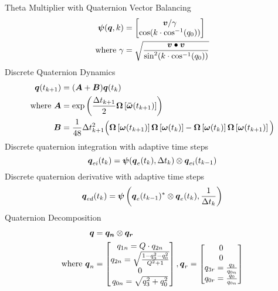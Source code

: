 \begin{nomenclature}
Theta Multiplier with Quaternion Vector Balancing\\
\begin{equation}
  \begin{aligned}
    \boldsymbol{\psi}(\boldsymbol{q}, k) &= \begin{bmatrix} \boldsymbol{v} / \gamma \\ \cos ( k \cdot \cos^{-1} (q_0))  \end{bmatrix} \\
    \text{where } \gamma &= \sqrt{\frac{\boldsymbol{v} \bullet \boldsymbol{v}}{\sin^2 ( k \cdot \cos^{-1} (q_0))}}
   \end{aligned}
\end{equation}
Discrete Quaternion Dynamics
\begin{equation}
  \begin{aligned}
    \boldsymbol{q}(t_{k+1}) &= ( \boldsymbol{A} + \boldsymbol{B} ) \boldsymbol{q}(t_{k}) \\
    \text{where } \boldsymbol{A} &= \exp \left( \frac{\Delta t_{k+1}}{2} \boldsymbol{\Omega} \left[ \boldsymbol{\bar{\omega}}(t_{k+1}) \right] \right)\\
    \boldsymbol{B} &= \frac{1}{48} \Delta t_{k+1}^2 \Big(
    \boldsymbol{\Omega} \left[\boldsymbol{\omega}(t_{k+1}) \right]
    \boldsymbol{\Omega} \left[\boldsymbol{\omega}(t_{k})   \right] -
    \boldsymbol{\Omega} \left[\boldsymbol{\omega}(t_{k})   \right]
    \boldsymbol{\Omega} \left[\boldsymbol{\omega}(t_{k+1}) \right]
      \Big)
  \end{aligned}
\end{equation}
Discrete quaternion integration with adaptive time steps\\
\begin{equation} \boldsymbol{q}_{ei}(t_k) = \boldsymbol{\psi}(\boldsymbol{q}_e(t_{k}), \Delta t_{k}) \otimes \boldsymbol{q}_{ei}(t_{k-1}) \end{equation}
Discrete quaternion derivative with adaptive time steps\\
\begin{equation} \boldsymbol{q}_{ed}(t_k) = \boldsymbol{\psi}\left(\boldsymbol{q}_e(t_{k-1})^* \otimes \boldsymbol{q}_e(t_{k}), \frac{1}{\Delta t_{k}}\right) \end{equation}
Quaternion Decomposition
\begin{equation}
  \begin{aligned}
    \bs{q} &= \bs{q_n} \otimes \bs{q_r} \\
    \text{where } \bs{q}_n &= \begin{bmatrix} q_{1n} = Q \cdot q_{2n} \\ q_{2n} = \sqrt{ \frac{1  - q_3^2 - q_0^2}{Q^2 + 1} } \\ 0 \\ q_{0n} = \sqrt{q_3^2 + q_0^2} \end{bmatrix} , \bs{q}_r = \begin{bmatrix} 0 \\ 0 \\ q_{3r} = \frac{q_3}{q_{0n}} \\ q_{0r} = \frac{q_0}{q_{0n}} \end{bmatrix} \\

\end{aligned}
\end{equation}
\end{nomenclature}
